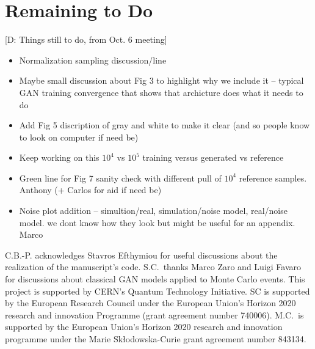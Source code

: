 \documentclass[twocolumn,preprintnumbers,superscriptaddress]{revtex4-2}
\newcommand{\commentDMG}[1]{{\color{orange} {[D: #1]}}}
\begin{document}
\section{Remaining to Do}
\commentDMG{Things still to do, from Oct. 6 meeting}
\begin{itemize}
\item Normalization sampling discussion/line
\item Maybe small discussion about Fig 3 to highlight why we include it -- typical GAN training convergence that shows that archicture does what it needs to do
\item Add Fig 5 discription of gray and white to make it clear (and so people know to look on computer if need be)
\item Keep working on this $10^4$ vs $10^5$ training versus generated vs reference
\item Green line for Fig 7 sanity check with different pull of $10^4$ reference samples. Anthony (+ Carlos for aid if need be)
\item Noise plot addition -- simultion/real, simulation/noise model, real/noise model. we dont know how they look but might be useful for an appendix. Marco
\end{itemize}

\acknowledgments

C.B.-P. acknowledges Stavros Efthymiou for useful discussions about the
realization of the manuscript's code. S.C.~thanks Marco Zaro and Luigi Favaro for
discussions about classical GAN models applied to Monte Carlo events. This
project is supported by CERN's Quantum Technology Initiative. SC is supported by the European Research
Council under the European Union's Horizon 2020 research and innovation
Programme (grant agreement number 740006).
M.C.\ is supported by the European Union’s Horizon 2020 research and innovation programme under the Marie Skłodowska-Curie grant agreement number 843134.


\end{document}
